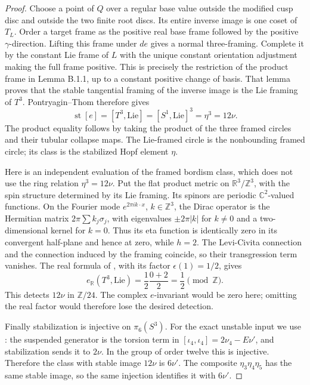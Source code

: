 \begin{proof}
Choose a point of $Q$ over a regular base value outside
the modified cusp disc and outside the two finite root
discs.  Its entire inverse image is one coset of $T_L$.
Order a target frame as the positive real base frame followed
by the positive $\gamma$-direction.  Lifting this frame
under $de$ gives a normal three-framing.  Complete it by
the constant Lie frame of $L$ with the unique constant
orientation adjustment making the full frame positive.
This is precisely the restriction of the product frame
in Lemma B.1.1, up to a constant positive change of basis.
That lemma proves that the stable tangential framing of
the inverse image is the Lie framing of $T^3$.
Pontryagin--Thom therefore gives
\[
 \operatorname{st}[e]=[T^3,\mathrm{Lie}]
 = [S^1,\mathrm{Lie}]^3=\eta^3=12\nu.
 \tag{B.1.2}
\]
The product equality follows by taking the product of the
three framed circles and their tubular collapse maps.
The Lie-framed circle is the nonbounding framed circle;
its class is the stabilized Hopf element $\eta$.

Here is an independent evaluation of the framed bordism
class, which does not use the ring relation $\eta^3=12\nu$.
Put the flat product metric on $\mathbb R^3/\mathbb Z^3$,
with the spin structure determined by its Lie framing.
Its spinors are periodic $\mathbb C^2$-valued functions.
On the Fourier mode $e^{2\pi i k\cdot x}$, $k\in\mathbb Z^3$,
the Dirac operator is the Hermitian matrix
$2\pi\sum k_j\sigma_j$, with eigenvalues
$\pm2\pi|k|$ for $k\ne0$ and a two-dimensional kernel
for $k=0$.  Thus its eta function is identically zero in
its convergent half-plane and hence at zero, while $h=2$.
The Levi-Civita connection and the connection induced
by the framing coincide, so their transgression term
vanishes.  The real formula of
\cite[Theorem (4.14), p.~423]{mapsAPS2}, with its factor
$\epsilon(1)=1/2$, gives
\[
 e_{\mathbb R}(T^3,\mathrm{Lie})
       =\frac12\frac{0+2}{2}=\frac12\pmod{\mathbb Z}.
 \tag{B.1.3}
\]
This detects $12\nu$ in $\mathbb Z/24$.  The complex
$e$-invariant would be zero here; omitting the real
factor would therefore lose the desired detection.

Finally stabilization is injective on $\pi_6(S^3)$.
For the exact unstable input we use
\cite[Theorem 4.1 and Corollaries 4.2--4.3]{mapsToda52}:
the suspended generator is the torsion term in
$[\iota_4,\iota_4]=2\nu_4-E\nu'$, and stabilization
sends it to $2\nu$.  In the group of order twelve this
is injective.  Therefore the class with stable image
$12\nu$ is $6\nu'$.  The composite
$\eta_3\eta_4\eta_5$ has the same stable image, so the
same injection identifies it with $6\nu'$.
\end{proof}

